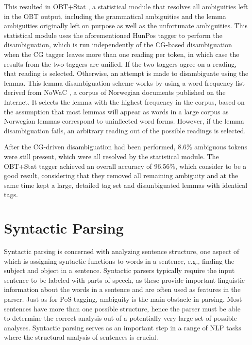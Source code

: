 \documentclass[a4paper,12pt,english]{book}
\begin{document}
This resulted in OBT+Stat \cite{Joh:Hag:Nok:11}, a statistical module that
resolves all ambiguities left in the OBT output, including the grammatical
ambiguities and the lemma ambiguities originally left on purpose as well as the
unfortunate ambiguities. This statistical module uses the aforementioned
HunPos tagger to perform the disambiguation, which is run independently of the
CG-based disambiguation when the CG tagger leaves more than one reading per
token, in which case the results from the two taggers are unified. If the two
taggers agree on a reading, that reading is selected.  Otherwise, an attempt is
made to disambiguate using the lemma. This lemma disambiguation scheme works by
using a word frequency list derived from NoWaC \cite{Gue:10}, a corpus of
Norwegian documents published on the Internet. It selects the lemma with the
highest frequency in the corpus, based on the assumption that most lemmas will
appear as words in a large corpus as Norwegian lemmas correspond to uninflected
word forms. However, if the lemma disambiguation fails, an arbitrary reading
out of the possible readings is selected.

After the CG-driven disambiguation had been performed, 8.6\% ambiguous tokens
were still present, which were all resolved by  the statistical module. The
OBT+Stat tagger achieved an overall accuracy of 96.56\%, which
 consider to be a good result, considering that they
removed all remaining ambiguity and at the same time kept a large, detailed tag
set and disambiguated lemmas with identical tags.

\section{Syntactic Parsing}
Syntactic parsing is concerned with analyzing sentence structure, one aspect of
which is assigning syntactic functions to words in a sentence, e.g., finding
the subject and object in a sentence.  Syntactic parsers typically require the
input sentence to be labeled with parts-of-speech, as these provide important
linguistic information about the words in a sentence and are often used as
features in the parser. Just as for PoS tagging, ambiguity is the main obstacle
in parsing. Most sentences have more than one possible structure, hence the
parser must be able to determine the correct analysis out of a potentially very
large set of possible analyses. Syntactic parsing serves as an important step
in a range of NLP tasks where the structural analysis of sentences is crucial.
\end{document}
